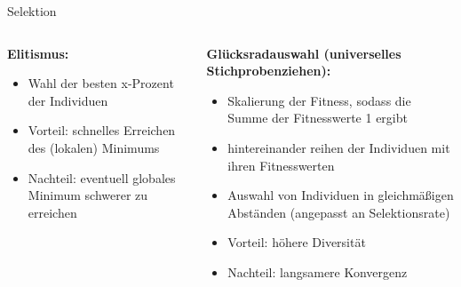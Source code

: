 \begin{frame}{Selektion}
    \begin{columns}[T] %
        \begin{column}{0.4\textwidth}
            \textbf{Elitismus:}
            \newline
            \begin{itemize}
                \item Wahl der besten x-Prozent der Individuen
                \item Vorteil: schnelles Erreichen des (lokalen) Minimums
                \item Nachteil: eventuell globales Minimum schwerer zu erreichen
            \end{itemize}
        \end{column}
        \begin{column}{0.6\textwidth}
            \textbf{Glücksradauswahl (universelles Stichprobenziehen):}
            \begin{itemize}
                \item Skalierung der Fitness, sodass die Summe der
                Fitnesswerte 1 ergibt
                \item hintereinander reihen der Individuen mit ihren Fitnesswerten
                \item Auswahl von Individuen in gleichmäßigen Abständen (angepasst an Selektionsrate)
                \item Vorteil: höhere Diversität
                \item Nachteil: langsamere Konvergenz
            \end{itemize}
        \end{column}
    \end{columns}
\end{frame}